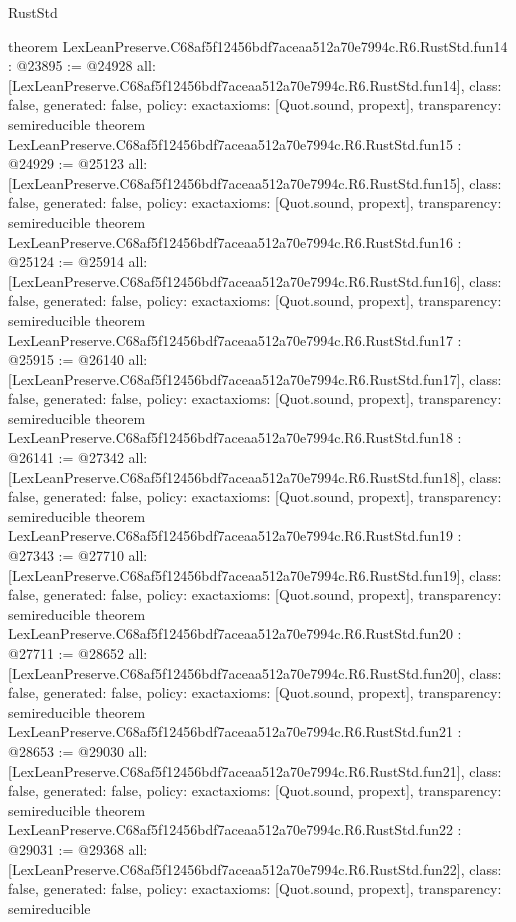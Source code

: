 \begin{lexlean}{RustStd}
\begin{coremodule}
{}
theorem LexLeanPreserve.C68af5f12456bdf7aceaa512a70e7994c.R6.RustStd.fun14 : @23895 := @24928 {
  all: [LexLeanPreserve.C68af5f12456bdf7aceaa512a70e7994c.R6.RustStd.fun14],
  class: false,
  generated: false,
  policy: exact{axioms: [Quot.sound, propext]},
  transparency: semireducible
}
theorem LexLeanPreserve.C68af5f12456bdf7aceaa512a70e7994c.R6.RustStd.fun15 : @24929 := @25123 {
  all: [LexLeanPreserve.C68af5f12456bdf7aceaa512a70e7994c.R6.RustStd.fun15],
  class: false,
  generated: false,
  policy: exact{axioms: [Quot.sound, propext]},
  transparency: semireducible
}
theorem LexLeanPreserve.C68af5f12456bdf7aceaa512a70e7994c.R6.RustStd.fun16 : @25124 := @25914 {
  all: [LexLeanPreserve.C68af5f12456bdf7aceaa512a70e7994c.R6.RustStd.fun16],
  class: false,
  generated: false,
  policy: exact{axioms: [Quot.sound, propext]},
  transparency: semireducible
}
theorem LexLeanPreserve.C68af5f12456bdf7aceaa512a70e7994c.R6.RustStd.fun17 : @25915 := @26140 {
  all: [LexLeanPreserve.C68af5f12456bdf7aceaa512a70e7994c.R6.RustStd.fun17],
  class: false,
  generated: false,
  policy: exact{axioms: [Quot.sound, propext]},
  transparency: semireducible
}
theorem LexLeanPreserve.C68af5f12456bdf7aceaa512a70e7994c.R6.RustStd.fun18 : @26141 := @27342 {
  all: [LexLeanPreserve.C68af5f12456bdf7aceaa512a70e7994c.R6.RustStd.fun18],
  class: false,
  generated: false,
  policy: exact{axioms: [Quot.sound, propext]},
  transparency: semireducible
}
theorem LexLeanPreserve.C68af5f12456bdf7aceaa512a70e7994c.R6.RustStd.fun19 : @27343 := @27710 {
  all: [LexLeanPreserve.C68af5f12456bdf7aceaa512a70e7994c.R6.RustStd.fun19],
  class: false,
  generated: false,
  policy: exact{axioms: [Quot.sound, propext]},
  transparency: semireducible
}
theorem LexLeanPreserve.C68af5f12456bdf7aceaa512a70e7994c.R6.RustStd.fun20 : @27711 := @28652 {
  all: [LexLeanPreserve.C68af5f12456bdf7aceaa512a70e7994c.R6.RustStd.fun20],
  class: false,
  generated: false,
  policy: exact{axioms: [Quot.sound, propext]},
  transparency: semireducible
}
theorem LexLeanPreserve.C68af5f12456bdf7aceaa512a70e7994c.R6.RustStd.fun21 : @28653 := @29030 {
  all: [LexLeanPreserve.C68af5f12456bdf7aceaa512a70e7994c.R6.RustStd.fun21],
  class: false,
  generated: false,
  policy: exact{axioms: [Quot.sound, propext]},
  transparency: semireducible
}
theorem LexLeanPreserve.C68af5f12456bdf7aceaa512a70e7994c.R6.RustStd.fun22 : @29031 := @29368 {
  all: [LexLeanPreserve.C68af5f12456bdf7aceaa512a70e7994c.R6.RustStd.fun22],
  class: false,
  generated: false,
  policy: exact{axioms: [Quot.sound, propext]},
  transparency: semireducible
}
\end{coremodule}
\end{lexlean}
